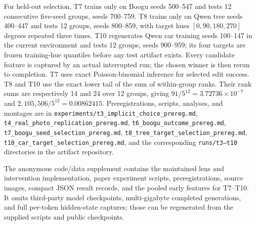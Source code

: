 \documentclass[10pt,twocolumn,letterpaper]{article}
\begin{document}
For held-out selection, T7 trains only on Boogu seeds 500--547 and tests
12 consecutive five-seed groups, seeds 700--759. T8 trains only on Qwen
tree seeds 400--447 and tests 12 groups, seeds 800--859, with target hues
$[0,90,180,270]$ degrees repeated three times. T10 regenerates Qwen car
training seeds 100--147 in the current environment and tests 12 groups,
seeds 900--959; its four targets are frozen training-hue quantiles before
any test artifact exists. Every candidate feature is captured by an
actual interrupted run; the chosen winner is then rerun to completion.
T7 uses exact Poisson-binomial inference for selected edit success. T8
and T10 use the exact lower tail of the sum of within-group ranks. Their
rank sums are respectively 14 and 24 over 12 groups, giving
$91/5^{12}=3.72736\times10^{-7}$ and
$2{,}105{,}506/5^{12}=0.00862415$.
Preregistrations, scripts, analyses, and montages are in
\texttt{experiments/t3\_implicit\_choice\_prereg.md},
\texttt{t4\_real\_photo\_replication\_prereg.md},
\texttt{t6\_boogu\_outcome\_prereg.md},
\texttt{t7\_boogu\_seed\_selection\_prereg.md},
\texttt{t8\_tree\_target\_selection\_prereg.md},
\texttt{t10\_car\_target\_selection\_prereg.md}, and the corresponding
\texttt{runs/t3--t10} directories in the artifact repository.

The anonymous code/data supplement contains the maintained lens and
intervention implementation, paper experiment scripts, preregistrations,
source images, compact JSON result records, and the pooled early features for
T7--T10. It omits third-party model checkpoints, multi-gigabyte completed
generations, and full per-token hidden-state captures; those can be regenerated
from the supplied scripts and public checkpoints.
\end{document}

